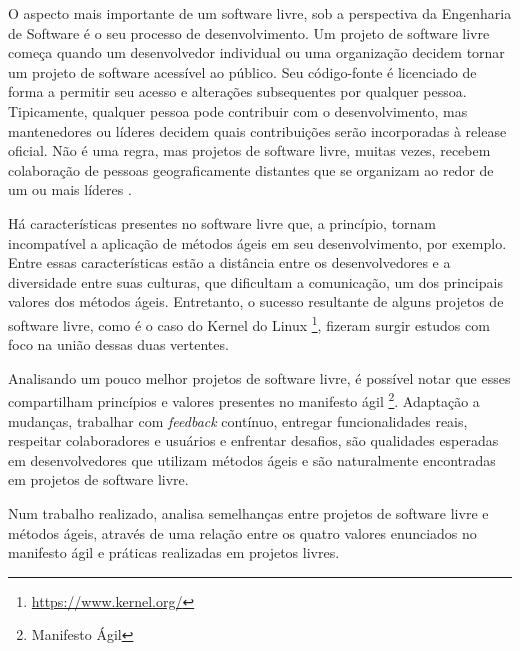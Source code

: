 O aspecto mais importante de um software livre, sob a perspectiva da Engenharia de Software é o seu processo de desenvolvimento. Um projeto de software livre começa quando um desenvolvedor individual ou uma organização decidem tornar um projeto de software acessível ao público. Seu código-fonte é licenciado de forma a permitir seu acesso e alterações subsequentes por qualquer pessoa. Tipicamente, qualquer pessoa pode contribuir com o desenvolvimento, mas mantenedores ou líderes decidem quais contribuições serão incorporadas à release oficial. Não é uma regra, mas projetos de software livre, muitas vezes, recebem colaboração de pessoas geograficamente distantes que se organizam ao redor de um ou mais líderes \cite{corbucci2011freemethods}. 

Há características presentes no software livre que, a princípio, tornam incompatível a aplicação de métodos ágeis em seu desenvolvimento, por exemplo. Entre essas características estão a distância entre os desenvolvedores e a diversidade entre suas culturas, que dificultam a comunicação, um dos principais valores dos métodos ágeis. Entretanto, o sucesso resultante de alguns projetos de software livre, como é o caso do Kernel do Linux \footnote{\url{https://www.kernel.org/}}, fizeram surgir estudos com foco na união dessas duas vertentes.

Analisando um pouco melhor projetos de software livre, é possível notar que esses compartilham princípios e valores presentes no manifesto ágil \footnote{Manifesto Ágil}. Adaptação a mudanças, trabalhar com \textit{feedback} contínuo, entregar funcionalidades reais, respeitar colaboradores e usuários e enfrentar desafios, são qualidades esperadas em desenvolvedores que utilizam métodos ágeis e são naturalmente encontradas em projetos de software livre.

Num trabalho realizado,  analisa semelhanças entre projetos de software livre e métodos ágeis, através de uma relação entre os quatro valores enunciados no manifesto ágil e práticas realizadas em projetos livres. 



